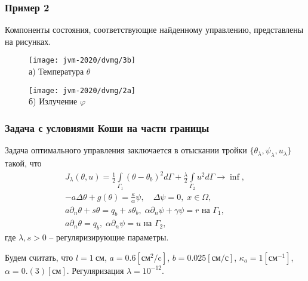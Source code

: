\begin{frame}
    \frametitle{Пример 2}

    Компоненты состояния, соответствующие найденному управлению, представлены на
    рисунках.


    \begin{figure}[h!t]
        \begin{minipage}[b][][b]{0.49\linewidth}
            \centering
            \texttt{[image: jvm-2020/dvmg/3b]}
            \\ а) Температура $\theta$
        \end{minipage}
        \hfill
        \begin{minipage}[b][][b]{0.49\linewidth}
            \centering
            \texttt{[image: jvm-2020/dvmg/2a]}
            \\ б) Излучение $\varphi$
        \end{minipage}
        \label{fig:4_4:4}
    \end{figure}

\end{frame}

\begin{frame}
    \frametitle{Задача с условиями Коши на части границы}

    Задача оптимального управления
    заключается в отыскании тройки $\{\theta_\lambda,\psi_\lambda,u_\lambda\}$ такой, что
    \begin{gather*}
        J_\lambda(\theta, u) =
        \frac{1}{2} \int \limits_{\Gamma_1} (\theta - \theta_b)^2 d \Gamma
        + \frac{\lambda}{2}\int\limits_{\Gamma_2} u^2 d\Gamma \rightarrow \inf, \\
        - a \Delta \theta + g (\theta) = \frac{\kappa}{\alpha}\psi, \quad
        \Delta \psi = 0, \; x \in \Omega, \\
        a \partial_n \theta + s \theta = q_b + s \theta_b,
        \; \alpha \partial_n \psi + \gamma \psi = r
        \text{ на } \Gamma_1,\\
        a \partial_n \theta = q_b, \;
        \alpha \partial_n \psi = u \text{ на } \Gamma_2,
    \end{gather*}
    где $\lambda, s > 0$ -- регуляризирующие параметры.

    Будем считать, что
    $l = 1~\text{см}$,
    $a = 0.6[\text{см}^2/\text{c}]$,
    $b = 0.025[\text{см}/\text{с}]$,
    $\kappa_a = 1[\text{см}^{-1}]$,
    $\alpha = 0.(3)[\text{см}]$.
    Регуляризация $\lambda=10^{-12}$.
\end{frame}

